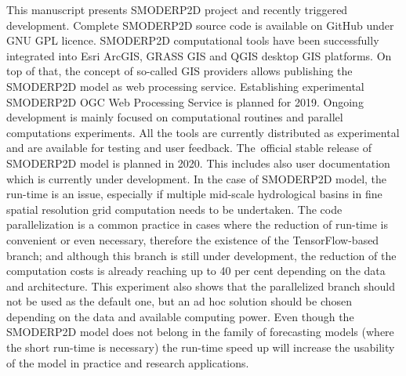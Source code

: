 This manuscript presents SMODERP2D project and recently triggered 
development. Complete SMODERP2D source code is available on GitHub 
\cite{xxx} under GNU GPL licence. SMODERP2D computational tools have 
been successfully integrated into Esri ArcGIS, GRASS GIS and QGIS desktop GIS platforms. On top of that, the concept of so-called GIS providers allows publishing the SMODERP2D model as web processing service. Establishing experimental SMODERP2D 
OGC Web Processing Service is planned for 2019. Ongoing development 
is mainly focused on computational routines and parallel computations experiments. All the tools are currently distributed as experimental and are available for testing and user feedback.
The~official stable release of SMODERP2D model is planned in 2020. This 
includes also user documentation which is currently under development. 
In the 
case of SMODERP2D model, the run-time is an issue, especially 
if multiple mid-scale hydrological basins in fine spatial 
resolution grid computation needs to be undertaken. The code parallelization
is a common practice in cases where 
the reduction of run-time is convenient or even necessary, therefore
the existence of the TensorFlow-based branch; and although this branch is still
under development, the reduction of the computation costs is already reaching up to 40 per
cent depending on the data and architecture. This experiment also shows that the parallelized branch should not be used as the default one, but an ad hoc solution should be chosen depending on the data and available computing power. Even 
though the SMODERP2D model does not belong in the family of forecasting 
models (where the short run-time is necessary)  the run-time speed 
up will increase the usability of the model in practice and research applications. 
